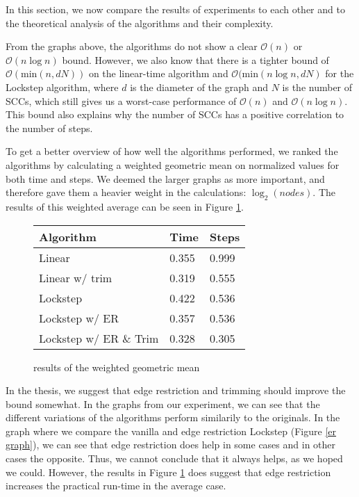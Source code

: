 \documentclass[../master/master.tex]{subfiles}
\begin{document}
In this section, we now compare the results of experiments to each other and to the theoretical analysis of the algorithms and their complexity.

From the graphs above, the algorithms do not show a clear $\mathcal{O}(n)$ or $\mathcal{O}(n\log n)$ bound. However, we also know that there is a tighter bound of $\mathcal{O}(\text{min}(n, dN))$ on the linear-time algorithm and $\mathcal{O}(\text{min}(n\log n, dN)$ for the Lockstep algorithm, where $d$ is the diameter of the graph and $N$ is the number of SCCs, which still gives us a worst-case performance of $\mathcal{O}(n)$ and $\mathcal{O}(n\log n)$. This bound also explains why the number of SCCs has a positive correlation to the number of steps.

To get a better overview of how well the algorithms performed, we ranked the algorithms by calculating a weighted geometric mean on normalized values for both time and steps. We deemed the larger graphs as more important, and therefore gave them a heavier weight in the calculations: $\log_2(nodes)$. The results of this weighted average can be seen in Figure \ref{mean}.

\begin{figure}[h]
  \centering
  \begin{tabular}{|l|l|l|}
    \hline
    Algorithm              & Time   & Steps  \\
    \hline
    Linear                 & 0.355 & 0.999 \\
    \hline
    Linear w/ trim         & 0.319 & 0.555 \\
    \hline
    Lockstep               & 0.422 & 0.536 \\
    \hline
    Lockstep w/ ER         & 0.357 & 0.536 \\
    \hline
    Lockstep w/ ER \& Trim & 0.328 & 0.305 \\
    \hline
\end{tabular}
\caption{results of the weighted geometric mean}\label{mean}
\end{figure}

In the thesis, we suggest that edge restriction and trimming should improve the bound somewhat. In the graphs from our experiment, we can see that the different variations of the algorithms perform similarily to the originals. In the graph where we compare the vanilla and edge restriction Lockstep (Figure \ref{er graph}), we can see that edge restriction does help in some cases and in other cases the opposite. Thus, we cannot conclude that it always helps, as we hoped we could. However, the results in Figure \ref{mean} does suggest that edge restriction increases the practical run-time in the average case. 
\end{document}
